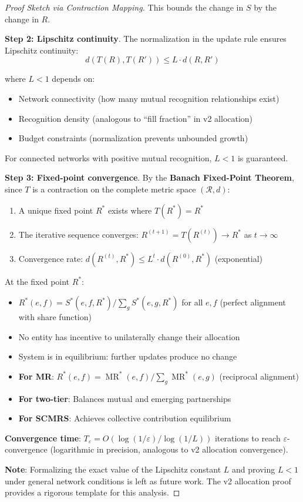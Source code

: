 \documentclass[11pt,a4paper]{article}
\theoremstyle{definition}
\theoremstyle{remark}
\DeclareMathOperator{\MR}{MR}
\begin{document}
\begin{proof}[Proof Sketch via Contraction Mapping]
This bounds the change in $S$ by the change in $R$.

\textbf{Step 2: Lipschitz continuity}. The normalization in the update rule ensures Lipschitz continuity:
\[ d(T(R), T(R')) \le L \cdot d(R, R') \]

where $L < 1$ depends on:
\begin{itemize}
\item Network connectivity (how many mutual recognition relationships exist)
\item Recognition density (analogous to ``fill fraction'' in v2 allocation)
\item Budget constraints (normalization prevents unbounded growth)
\end{itemize}

For connected networks with positive mutual recognition, $L < 1$ is guaranteed.

\textbf{Step 3: Fixed-point convergence}. By the \textbf{Banach Fixed-Point Theorem}, since $T$ is a contraction on the complete metric space $(\mathcal{R}, d)$:
\begin{enumerate}
\item A unique fixed point $R^*$ exists where $T(R^*) = R^*$
\item The iterative sequence converges: $R^{(t+1)} = T(R^{(t)}) \to R^*$ as $t \to \infty$
\item Convergence rate: $d(R^{(t)}, R^*) \le L^t \cdot d(R^{(0)}, R^*)$ (exponential)
\end{enumerate}

At the fixed point $R^*$:
\begin{itemize}
\item $R^*(e,f) = S^*(e,f,R^*) / \sum_g S^*(e,g,R^*)$ for all $e,f$ (perfect alignment with share function)
\item No entity has incentive to unilaterally change their allocation
\item System is in equilibrium: further updates produce no change
\item \textbf{For MR}: $R^*(e,f) = \MR^*(e,f) / \sum_g \MR^*(e,g)$ (reciprocal alignment)
\item \textbf{For two-tier}: Balances mutual and emerging partnerships
\item \textbf{For SCMRS}: Achieves collective contribution equilibrium
\end{itemize}

\textbf{Convergence time}: $T_\varepsilon = O(\log(1/\varepsilon) / \log(1/L))$ iterations to reach $\varepsilon$-convergence (logarithmic in precision, analogous to v2 allocation convergence).

\textbf{Note}: Formalizing the exact value of the Lipschitz constant $L$ and proving $L < 1$ under general network conditions is left as future work. The v2 allocation proof provides a rigorous template for this analysis.
\end{proof}
\end{document}
